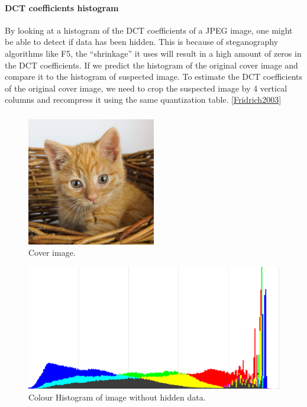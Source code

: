\paragraph*{DCT coefficients histogram}
By looking at a histogram of the DCT coefficients of a JPEG image, one might be able to detect if data has been hidden.
This is because of steganography algorithms like F5, the ``shrinkage'' it uses will result in a high amount of zeros in the DCT coefficients.
If we predict the histogram of the original cover image and compare it to the histogram of suspected image.
To estimate the DCT coefficients of the original cover image, we need to crop the suspected image by 4 vertical columns and recompress it using the same quantization table. \ref{Fridrich2003}

\subsubsection*{}

\begin{figure}
	\centering
	\includegraphics[width=0.5\textwidth]{figures/cover.jpg}
	\caption{Cover image.}
	\label{fig:CoverImage}
\end{figure}

\begin{figure}
	\centering
	\includegraphics[width=1\textwidth]{figures/HistoLSBCat.png}
	\caption{Colour Histogram of image without hidden data.}
	\label{fig:HistoWithoutLSB}
\end{figure}

